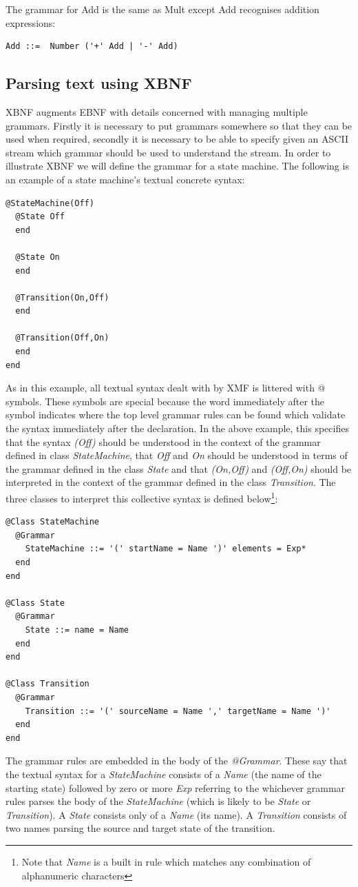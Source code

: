 The grammar for Add is the same as Mult except Add recognises addition expressions:

\begin{verbatim}
Add ::=  Number ('+' Add | '-' Add)
\end{verbatim}

\subsection{Parsing text using XBNF}

XBNF augments EBNF with details concerned with managing multiple grammars.  Firstly it is necessary to put grammars somewhere so that they can be used when required, secondly it is necessary to be able to specify given an ASCII stream which grammar should be used to understand the stream.  In order to illustrate XBNF we will define the grammar for a state machine.  The following is an example of a state machine's textual concrete syntax:

\begin{lstlisting}
@StateMachine(Off)
  @State Off
  end

  @State On
  end

  @Transition(On,Off)
  end

  @Transition(Off,On)
  end
end
\end{lstlisting}\noindent As in this example, all textual syntax dealt with by XMF is littered with @ symbols.  These symbols are
special because the word immediately after the symbol indicates where the top level grammar rules can be found which validate the syntax immediately after the declaration.  In the above example, this specifies that the syntax \emph{(Off)} should be understood in the context of the grammar defined in class \emph{StateMachine}, that \emph{Off} and \emph{On} should be understood in terms of the grammar defined in the class \emph{State} and that \emph{(On,Off)} and \emph{(Off,On)} should be interpreted in the context of the grammar defined in the class \emph{Transition}.  The three classes to interpret this collective syntax is defined below\footnote{Note that \emph{Name} is a built in rule which matches any combination of alphanumeric characters}:

\begin{lstlisting}
@Class StateMachine
  @Grammar
    StateMachine ::= '(' startName = Name ')' elements = Exp*
  end
end

@Class State
  @Grammar
    State ::= name = Name
  end
end

@Class Transition
  @Grammar
    Transition ::= '(' sourceName = Name ',' targetName = Name ')'
  end
end
\end{lstlisting}\noindent The grammar rules are embedded in the body of the \emph{@Grammar}.  These say that the textual syntax for a
\emph{StateMachine} consists of a \emph{Name} (the name of the starting state) followed by zero or more \emph{Exp} referring to the whichever grammar rules parses the body of the \emph{StateMachine} (which is likely to be \emph{State} or \emph{Transition}).  A \emph{State} consists only of a \emph{Name} (its name).  A \emph{Transition} consists of two names parsing the source and target state of the transition.


